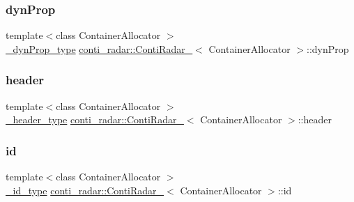 \subsubsection{\texorpdfstring{dyn\+Prop}{dynProp}}
{\footnotesize\ttfamily template$<$class Container\+Allocator $>$ \\
\hyperlink{structconti__radar_1_1ContiRadar___aa7a6bebffccc2d73549b176d1230e1dc}{\+\_\+dyn\+Prop\+\_\+type} \hyperlink{structconti__radar_1_1ContiRadar__}{conti\+\_\+radar\+::\+Conti\+Radar\+\_\+}$<$ Container\+Allocator $>$\+::dyn\+Prop}

\mbox{\label{structconti__radar_1_1ContiRadar___a4ec2177958e962e3bceb7fec73485c9d}} 
\subsubsection{\texorpdfstring{header}{header}}
{\footnotesize\ttfamily template$<$class Container\+Allocator $>$ \\
\hyperlink{structconti__radar_1_1ContiRadar___a0e76e7ae9ddced00c45c5935daea918f}{\+\_\+header\+\_\+type} \hyperlink{structconti__radar_1_1ContiRadar__}{conti\+\_\+radar\+::\+Conti\+Radar\+\_\+}$<$ Container\+Allocator $>$\+::header}

\mbox{\label{structconti__radar_1_1ContiRadar___a081e0cd214173e4dbaf4ca61e7870a2b}} 
\subsubsection{\texorpdfstring{id}{id}}
{\footnotesize\ttfamily template$<$class Container\+Allocator $>$ \\
\hyperlink{structconti__radar_1_1ContiRadar___aa24d813acf1184f22dbd33d1301d8887}{\+\_\+id\+\_\+type} \hyperlink{structconti__radar_1_1ContiRadar__}{conti\+\_\+radar\+::\+Conti\+Radar\+\_\+}$<$ Container\+Allocator $>$\+::id}

\mbox{\label{structconti__radar_1_1ContiRadar___acc4007bdcd484feb993ac40e86f713c1}} 
